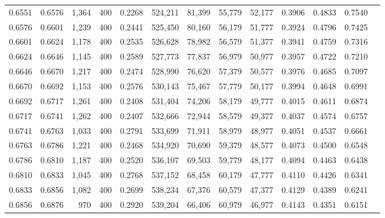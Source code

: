 \begin{tabular}{rrrrrrrrrrrrr}
0.6551 & 0.6576 &  1,364 &   400 &                                     0.2268 & 524,211 &  81,399 &  55,779 &  52,177 & 0.3906 & 0.4833 & 0.7540 \\
0.6576 & 0.6601 &  1,239 &   400 &                                     0.2441 & 525,450 &  80,160 &  56,179 &  51,777 & 0.3924 & 0.4796 & 0.7425 \\
0.6601 & 0.6624 &  1,178 &   400 &                                     0.2535 & 526,628 &  78,982 &  56,579 &  51,377 & 0.3941 & 0.4759 & 0.7316 \\
0.6624 & 0.6646 &  1,145 &   400 &                                     0.2589 & 527,773 &  77,837 &  56,979 &  50,977 & 0.3957 & 0.4722 & 0.7210 \\
0.6646 & 0.6670 &  1,217 &   400 &                                     0.2474 & 528,990 &  76,620 &  57,379 &  50,577 & 0.3976 & 0.4685 & 0.7097 \\
0.6670 & 0.6692 &  1,153 &   400 &                                     0.2576 & 530,143 &  75,467 &  57,779 &  50,177 & 0.3994 & 0.4648 & 0.6991 \\
0.6692 & 0.6717 &  1,261 &   400 &                                     0.2408 & 531,404 &  74,206 &  58,179 &  49,777 & 0.4015 & 0.4611 & 0.6874 \\
0.6717 & 0.6741 &  1,262 &   400 &                                     0.2407 & 532,666 &  72,944 &  58,579 &  49,377 & 0.4037 & 0.4574 & 0.6757 \\
0.6741 & 0.6763 &  1,033 &   400 &                                     0.2791 & 533,699 &  71,911 &  58,979 &  48,977 & 0.4051 & 0.4537 & 0.6661 \\
0.6763 & 0.6786 &  1,221 &   400 &                                     0.2468 & 534,920 &  70,690 &  59,379 &  48,577 & 0.4073 & 0.4500 & 0.6548 \\
0.6786 & 0.6810 &  1,187 &   400 &                                     0.2520 & 536,107 &  69,503 &  59,779 &  48,177 & 0.4094 & 0.4463 & 0.6438 \\
0.6810 & 0.6833 &  1,045 &   400 &                                     0.2768 & 537,152 &  68,458 &  60,179 &  47,777 & 0.4110 & 0.4426 & 0.6341 \\
0.6833 & 0.6856 &  1,082 &   400 &                                     0.2699 & 538,234 &  67,376 &  60,579 &  47,377 & 0.4129 & 0.4389 & 0.6241 \\
0.6856 & 0.6876 &    970 &   400 &                                     0.2920 & 539,204 &  66,406 &  60,979 &  46,977 & 0.4143 & 0.4351 & 0.6151 \\

\end{tabular}
